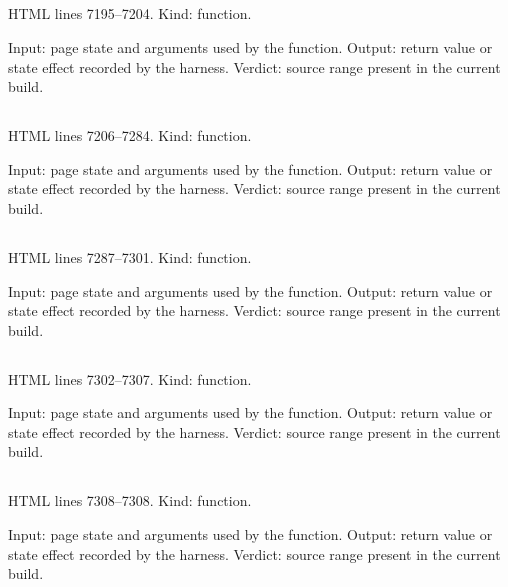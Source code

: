 \subsection*{\texttt{}}
\label{vf_357_mgStatusPaint}
HTML lines 7195--7204. Kind: function.

Input: page state and arguments used by the function.
Output: return value or state effect recorded by the harness.
Verdict: source range present in the current build.

\subsection*{\texttt{}}
\label{vf_358_mgRender}
HTML lines 7206--7284. Kind: function.

Input: page state and arguments used by the function.
Output: return value or state effect recorded by the harness.
Verdict: source range present in the current build.

\subsection*{\texttt{}}
\label{vf_359_mgSheet}
HTML lines 7287--7301. Kind: function.

Input: page state and arguments used by the function.
Output: return value or state effect recorded by the harness.
Verdict: source range present in the current build.

\subsection*{\texttt{}}
\label{vf_360_mgSheetPick}
HTML lines 7302--7307. Kind: function.

Input: page state and arguments used by the function.
Output: return value or state effect recorded by the harness.
Verdict: source range present in the current build.

\subsection*{\texttt{}}
\label{vf_361_mgSheetClose}
HTML lines 7308--7308. Kind: function.

Input: page state and arguments used by the function.
Output: return value or state effect recorded by the harness.
Verdict: source range present in the current build.

